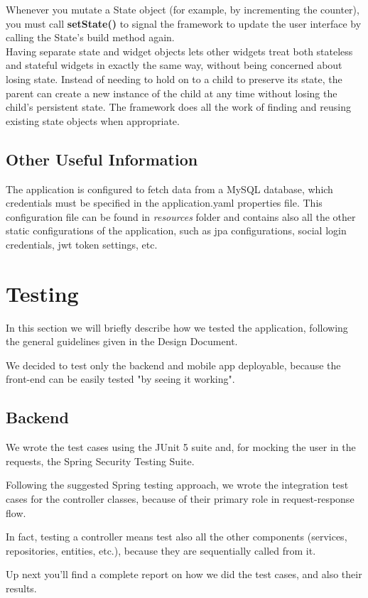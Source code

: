 \documentclass[table, 12pt]{article}
\begin{document}
Whenever you mutate a State object (for example, by incrementing the counter), you must call \textbf{setState()} to signal the framework to update the user interface by calling the State’s build method again.\\
Having separate state and widget objects lets other widgets treat both stateless and stateful widgets in exactly the same way, without being concerned about losing state. Instead of needing to hold on to a child to preserve its state, the parent can create a new instance of the child at any time without losing the child’s persistent state. The framework does all the work of finding and reusing existing state objects when appropriate.


\subsection{Other Useful Information}
The application is configured to fetch data from a MySQL database, which credentials must be specified in the application.yaml properties file. This configuration file can be found in \textit{resources} folder and contains also all the other static configurations of the application, such as jpa configurations, social login credentials, jwt token settings, etc.
\newpage
\section{Testing}
\label{testing}
In this section we will briefly describe how we tested the application, following the general guidelines given in the Design Document.

We decided to test only the backend and mobile app deployable, because the front-end can be easily tested "by seeing it working".
\subsection{Backend}
We wrote the test cases using the JUnit 5 suite and, for mocking the user in the requests, the Spring Security Testing Suite.

Following the suggested Spring testing approach, we wrote the integration test cases for the controller classes, because of their primary role in request-response flow.

In fact, testing a controller means test also all the other components (services, repositories, entities, etc.), because they are sequentially called from it.

Up next you'll find a complete report on how we did the test cases, and also their results.
\end{document}
